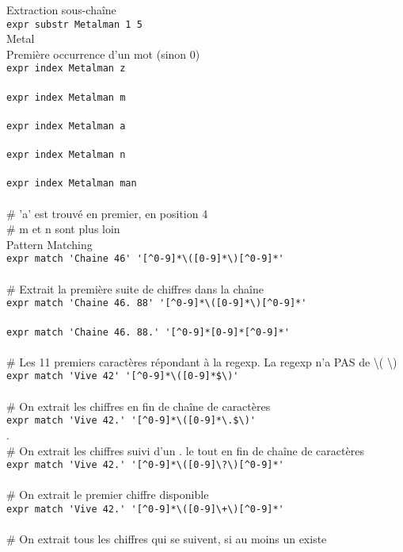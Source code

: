 \documentclass[10pt,landscape]{article}
\begin{document}
\begin{multicols}{3}
Extraction sous-chaîne\\
\verb!expr substr Metalman 1 5!\\
\textrightarrow Metal\\

Première occurrence d'un mot (sinon 0)\\
\verb!expr index Metalman z!\\
\\
\verb!expr index Metalman m!\\
\\
\verb!expr index Metalman a!\\
\\
\verb!expr index Metalman n!\\
\\
\verb!expr index Metalman man!\\
\\
\# 'a' est trouvé en premier, en position 4\\
\# m et n sont plus loin\\

Pattern Matching\\
\verb!expr match 'Chaine 46' '[^0-9]*\([0-9]*\)[^0-9]*'! \\
\\
\# Extrait la première suite de chiffres dans la chaîne\\
\verb!expr match 'Chaine 46. 88' '[^0-9]*\([0-9]*\)[^0-9]*'! \\
\\
\verb!expr match 'Chaine 46. 88.' '[^0-9]*[0-9]*[^0-9]*'! \\
\\
\# Les 11 premiers caractères répondant à la regexp. La regexp n'a PAS de \textbackslash( \textbackslash)\\
\verb!expr match 'Vive 42' '[^0-9]*\([0-9]*$\)'! \\
\\
\# On extrait les chiffres en fin de chaîne de caractères\\
\verb!expr match 'Vive 42.' '[^0-9]*\([0-9]*\.$\)'! \\
.\\
\# On extrait les chiffres suivi d'un . le tout en fin de chaîne de caractères\\
\verb!expr match 'Vive 42.' '[^0-9]*\([0-9]\?\)[^0-9]*'! \\
\\
\# On extrait le premier chiffre disponible\\
\verb!expr match 'Vive 42.' '[^0-9]*\([0-9]\+\)[^0-9]*'! \\
\\
\# On extrait tous les chiffres qui se suivent, si au moins un existe\\



\end{multicols}
\end{document}
